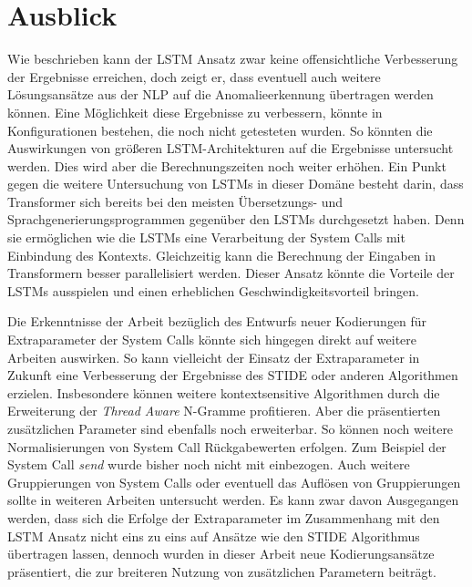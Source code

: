 \section{Ausblick}
Wie beschrieben kann der \ac{LSTM} Ansatz zwar keine offensichtliche Verbesserung der Ergebnisse erreichen, doch zeigt er, dass eventuell auch weitere Lösungsansätze aus der \ac{NLP} auf die Anomalieerkennung übertragen werden können.
Eine Möglichkeit diese Ergebnisse zu verbessern, könnte in Konfigurationen bestehen, die noch nicht getesteten wurden.
So könnten die Auswirkungen von größeren \ac{LSTM}-Architekturen auf die Ergebnisse untersucht werden.
Dies wird aber die Berechnungszeiten noch weiter erhöhen.
Ein Punkt gegen die weitere Untersuchung von \acp{LSTM} in dieser Domäne besteht darin, dass Transformer sich bereits bei den meisten Übersetzungs-  und Sprachgenerierungsprogrammen  gegenüber den \acp{LSTM} durchgesetzt haben. 
Denn sie ermöglichen wie die \acp{LSTM} eine Verarbeitung der System Calls mit Einbindung des Kontexts.
Gleichzeitig kann die Berechnung der Eingaben in Transformern besser parallelisiert werden.
Dieser Ansatz könnte die Vorteile der \acp{LSTM} ausspielen und einen erheblichen Geschwindigkeitsvorteil bringen.

Die Erkenntnisse der Arbeit bezüglich des Entwurfs neuer Kodierungen für Extraparameter der System Calls könnte sich hingegen direkt auf weitere Arbeiten auswirken.
So kann vielleicht der Einsatz der Extraparameter in Zukunft eine Verbesserung der Ergebnisse des \ac{STIDE} oder anderen Algorithmen erzielen.
Insbesondere können weitere kontextsensitive Algorithmen durch die Erweiterung der \textit{Thread Aware} N-Gramme profitieren. 
Aber die präsentierten zusätzlichen Parameter sind ebenfalls noch erweiterbar.
So können noch weitere Normalisierungen von System Call Rückgabewerten erfolgen.
Zum Beispiel der System Call \textit{send} wurde bisher noch nicht mit einbezogen.
Auch weitere Gruppierungen von System Calls oder eventuell das Auflösen von Gruppierungen sollte in weiteren Arbeiten untersucht werden.
Es kann zwar davon Ausgegangen werden, dass sich die Erfolge der Extraparameter im Zusammenhang mit den \ac{LSTM} Ansatz nicht eins zu eins auf Ansätze wie den \ac{STIDE} Algorithmus übertragen lassen, dennoch wurden in dieser Arbeit neue Kodierungsansätze präsentiert, die zur breiteren Nutzung von zusätzlichen Parametern beiträgt.

